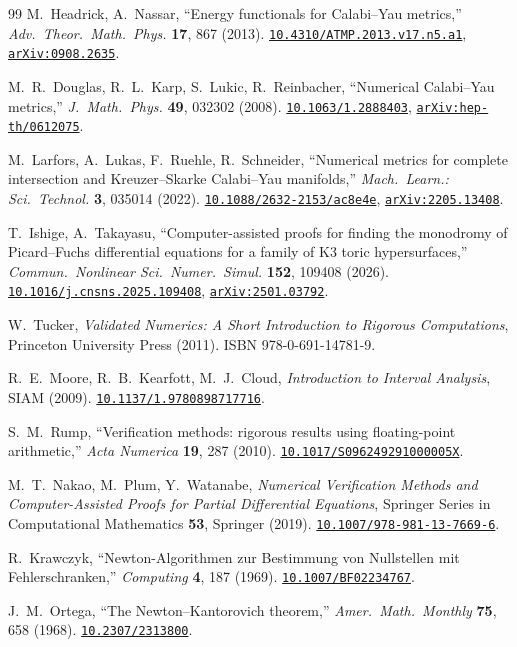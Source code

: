 \begin{thebibliography}{99}
 M.~Headrick, A.~Nassar, ``Energy functionals for Calabi--Yau metrics,'' \textit{Adv.\ Theor.\ Math.\ Phys.} \textbf{17}, 867 (2013). \href{https://doi.org/10.4310/ATMP.2013.v17.n5.a1}{\texttt{10.4310/ATMP.2013.v17.n5.a1}}, \href{https://arxiv.org/abs/0908.2635}{\texttt{arXiv:0908.2635}}.

 M.~R.~Douglas, R.~L.~Karp, S.~Lukic, R.~Reinbacher, ``Numerical Calabi--Yau metrics,'' \textit{J.\ Math.\ Phys.} \textbf{49}, 032302 (2008). \href{https://doi.org/10.1063/1.2888403}{\texttt{10.1063/1.2888403}}, \href{https://arxiv.org/abs/hep-th/0612075}{\texttt{arXiv:hep-th/0612075}}.

 M.~Larfors, A.~Lukas, F.~Ruehle, R.~Schneider, ``Numerical metrics for complete intersection and Kreuzer--Skarke Calabi--Yau manifolds,'' \textit{Mach.\ Learn.: Sci.\ Technol.} \textbf{3}, 035014 (2022). \href{https://doi.org/10.1088/2632-2153/ac8e4e}{\texttt{10.1088/2632-2153/ac8e4e}}, \href{https://arxiv.org/abs/2205.13408}{\texttt{arXiv:2205.13408}}.

 T.~Ishige, A.~Takayasu, ``Computer-assisted proofs for finding the monodromy of Picard--Fuchs differential equations for a family of K3 toric hypersurfaces,'' \textit{Commun.\ Nonlinear Sci.\ Numer.\ Simul.} \textbf{152}, 109408 (2026). \href{https://doi.org/10.1016/j.cnsns.2025.109408}{\texttt{10.1016/j.cnsns.2025.109408}}, \href{https://arxiv.org/abs/2501.03792}{\texttt{arXiv:2501.03792}}.

 W.~Tucker, \textit{Validated Numerics: A Short Introduction to Rigorous Computations}, Princeton University Press (2011). ISBN 978-0-691-14781-9.

 R.~E.~Moore, R.~B.~Kearfott, M.~J.~Cloud, \textit{Introduction to Interval Analysis}, SIAM (2009). \href{https://doi.org/10.1137/1.9780898717716}{\texttt{10.1137/1.9780898717716}}.

 S.~M.~Rump, ``Verification methods: rigorous results using floating-point arithmetic,'' \textit{Acta Numerica} \textbf{19}, 287 (2010). \href{https://doi.org/10.1017/S096249291000005X}{\texttt{10.1017/S096249291000005X}}.

 M.~T.~Nakao, M.~Plum, Y.~Watanabe, \textit{Numerical Verification Methods and Computer-Assisted Proofs for Partial Differential Equations}, Springer Series in Computational Mathematics \textbf{53}, Springer (2019). \href{https://doi.org/10.1007/978-981-13-7669-6}{\texttt{10.1007/978-981-13-7669-6}}.

 R.~Krawczyk, ``Newton-Algorithmen zur Bestimmung von Nullstellen mit Fehlerschranken,'' \textit{Computing} \textbf{4}, 187 (1969). \href{https://doi.org/10.1007/BF02234767}{\texttt{10.1007/BF02234767}}.

 J.~M.~Ortega, ``The Newton--Kantorovich theorem,'' \textit{Amer.\ Math.\ Monthly} \textbf{75}, 658 (1968). \href{https://doi.org/10.2307/2313800}{\texttt{10.2307/2313800}}.

\end{thebibliography}
